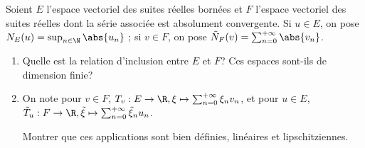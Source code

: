 \begin{enonce}
\begin{exercise}[ID={RMS126 E764},subtitle={Centrale PSI 2015},tags={}, difficulty={0}]
Soient $E$ l'espace vectoriel des suites réelles bornées et $F$ l'espace vectoriel des suites réelles dont la série associée est absolument convergente.
Si $u\in E$, on pose $N_E(u)=\sup_{n\in\N}\abs{u_n}$ ;
si $v\in F$, on pose $\tilde N_F(v) = \sum_{n=0}^{+\infty}\abs{v_n}$.
\begin{enumerate}
  \item Quelle est la relation d'inclusion entre $E$ et $F$?
    Ces espaces sont-ils de dimension finie?

  \item On note pour $v\in F$, $T_v:E\to \R, \xi\mapsto\sum_{n=0}^{+\infty} \xi_n v_n$,
    et pour $u\in E$, $\tilde T_u : F\to\R, \tilde\xi\mapsto\sum_{n=0}^{+\infty} \tilde\xi_n u_n$.

    Montrer que ces applications sont bien définies, linéaires et lipschitziennes.
\end{enumerate}
\end{exercise}
\begin{solution}
\end{solution}
\end{enonce}
